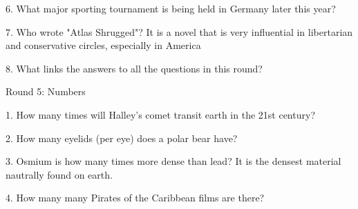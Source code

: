 \begin{frame}
\begin{center}
\Large
6. What major sporting tournament is being held in Germany later this year?
\\
\end{center}
\end{frame}
\begin{frame}
\begin{center}
\Large
7. Who wrote "Atlas Shrugged"? It is a novel that is very influential in libertarian and conservative circles, especially in America
\\
\end{center}
\end{frame}
\begin{frame}
\begin{center}
\Large
8. What links the answers to all the questions in this round?
\\
\end{center}
\end{frame}
\begin{frame}
\begin{center}
\Huge
Round 5: Numbers
\end{center}
\end{frame}
\begin{frame}
\begin{center}
\Large
1. How many times will Halley's comet transit earth in the 21st century?
\end{center}
\end{frame}
\begin{frame}
\begin{center}
\Large
2. How many eyelids (per eye) does a polar bear have?
\end{center}
\end{frame}
\begin{frame}
\begin{center}
\Large
3. Osmium is how many times more dense than lead? It is the densest material nautrally found on earth.
\end{center}
\end{frame}
\begin{frame}
\begin{center}
\Large
4. How many many Pirates of the Caribbean films are there?
\end{center}
\end{frame}
